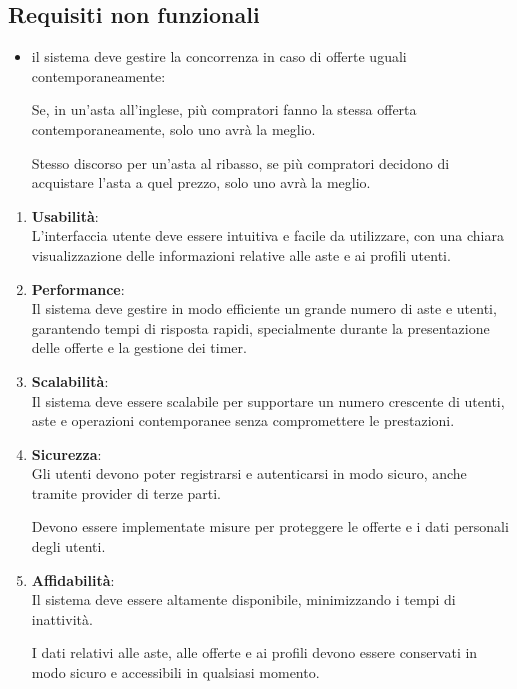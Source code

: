 \subsection{Requisiti non funzionali}
\begin{itemize}
	\item il sistema deve gestire la concorrenza in caso di offerte uguali contemporaneamente:

	      Se, in un'asta all'inglese, più compratori fanno la stessa offerta contemporaneamente, solo uno avrà la meglio.

	      Stesso discorso per un'asta al ribasso, se più compratori decidono di acquistare l'asta a quel prezzo, solo uno avrà la meglio.
\end{itemize}\bigskip
\begin{enumerate}
	\item {\sffamily \textbf{Usabilità}}:\\
	      L'interfaccia utente deve essere intuitiva e facile da utilizzare, con una chiara visualizzazione delle informazioni relative alle aste e ai profili utenti.

	\item {\sffamily \textbf{Performance}}:\\
	      Il sistema deve gestire in modo efficiente un grande numero di aste e utenti, garantendo tempi di risposta rapidi, specialmente durante la presentazione delle offerte e la gestione dei timer.

	\item {\sffamily \textbf{Scalabilità}}:\\
	      Il sistema deve essere scalabile per supportare un numero crescente di utenti, aste e operazioni contemporanee senza compromettere le prestazioni.

	\item {\sffamily \textbf{Sicurezza}}:\\
	      Gli utenti devono poter registrarsi e autenticarsi in modo sicuro, anche tramite provider di terze parti.

	      Devono essere implementate misure per proteggere le offerte e i dati personali degli utenti.

	\item {\sffamily \textbf{Affidabilità}}:\\
	      Il sistema deve essere altamente disponibile, minimizzando i tempi di inattività.

	      I dati relativi alle aste, alle offerte e ai profili devono essere conservati in modo sicuro e accessibili in qualsiasi momento.
\end{enumerate}


